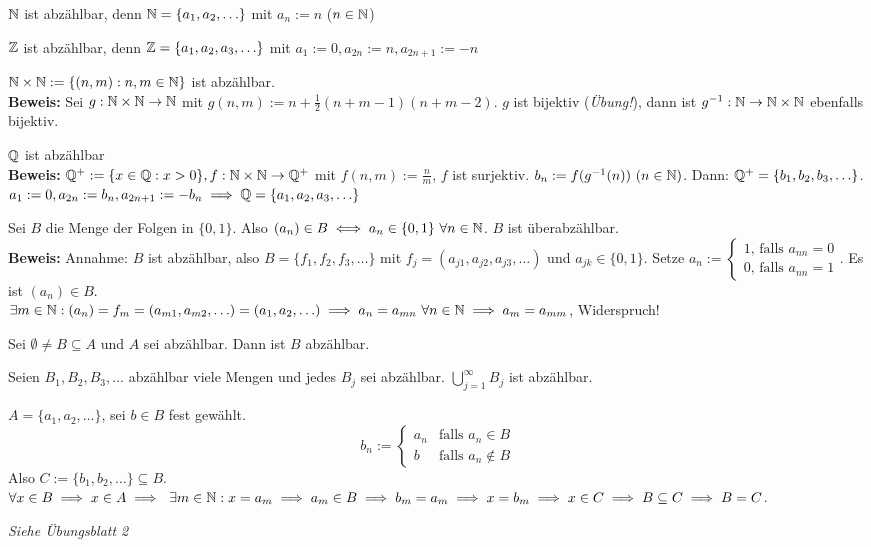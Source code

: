 \documentclass[a4paper,oneside,DIV15,BCOR12mm]{scrbook}
\begin{document}
\begin{beispiele}
\item $\mathbb{N}$ ist abzählbar, denn $\mathbb{N} = \{a_1,a_2,\ldots\}$ mit $a_n := n$ ($n\in \mathbb{N}$)
\item $\mathbb{Z}$ ist abzählbar, denn $\mathbb{Z} = \{a_1,a_2,a_3,\ldots\}$ mit $a_1:= 0, a_{2n} := n, a_{2n+1} := -n$
\item $\mathbb{N}\times\mathbb{N} := \{(n,m): n,m \in \mathbb{N}\}$ ist abzählbar.\\
\textbf{Beweis:} Sei $g: \mathbb{N}\times\mathbb{N} \rightarrow \mathbb{N}$ mit $g(n,m) := n+\frac{1}{2}(n+m-1)(n+m-2)$. $g$ ist bijektiv (\textit{Übung!}), dann ist $g^{-1}: \mathbb{N} \rightarrow \mathbb{N}\times\mathbb{N}$ ebenfalls bijektiv.
\item $\mathbb{Q}$ ist abzählbar\\
\textbf{Beweis:} $\mathbb{Q}^+ := \{x \in \mathbb{Q}: x>0\}, f:\mathbb{N}\times\mathbb{N} \rightarrow \mathbb{Q}^+$ mit $f(n,m) := \frac{n}{m}$, $f$ ist surjektiv. $b_n := f(g^{-1}(n))\ (n\in\MdN)$. Dann: $\mathbb{Q}^+ = \{b_1, b_2, b_3,\ldots\}$. $a_1:= 0, a_{2n} := b_n, a_{2n+1} := -b_n \implies \mathbb{Q} = \{a_1,a_2,a_3,\ldots\}$
\item Sei $B$ die Menge der Folgen in $\{0,1\}$. Also $(a_n)\in B \equizu a_n \in \{0,1\} \ \forall n \in \MdN$. $B$ ist überabzählbar.\\
\textbf{Beweis:} Annahme: $B$ ist abzählbar, also $B=\{f_1,f_2,f_3,\ldots\}$ mit $f_j = (a_{j1}, a_{j2}, a_{j3},\ldots)$ und $a_{jk} \in \{0,1\}$. Setze $a_n := \begin{cases}1\mbox{, falls } a_{nn} = 0 \\ 0\mbox{, falls }a_{nn} = 1\end{cases}$. Es ist $(a_n) \in B$. \\
$\exists m \in \mathbb{N}: (a_n) = f_m = (a_{m1}, a_{m2}, \ldots) = (a_1,a_2,\ldots) \implies a_n = a_{mn}\ \forall n \in \mathbb{N} \implies a_m = a_{mm}$, Widerspruch!
\end{beispiele}

\begin{satz*}
\begin{liste}
\item Sei $\emptyset \ne B \subseteq A$ und $A$ sei abzählbar. Dann ist $B$ abzählbar.
\item Seien $B_1, B_2, B_3, \ldots$ abzählbar viele Mengen und jedes $B_j$ sei abzählbar. $\displaystyle \bigcup_{j=1}^\infty B_j$ ist abzählbar.
\end{liste}
\end{satz*}

\begin{beweise}
\item $A = \{a_1,a_2,\ldots\}$, sei $b \in B$ fest gewählt.
$$ b_n := \begin{cases} a_n & \mbox{falls } a_n \in B \\ b & \mbox{falls } a_n \notin B \end{cases}$$
Also $C:=\{b_1,b_2,\ldots\} \subseteq B$. $\forall x \in B \folgt x \in A \folgt \ \exists m \in \MdN: x = a_m \folgt a_m \in B \folgt b_m = a_m \folgt x=b_m \folgt x \in C \folgt B \subseteq C \folgt B = C$.
\item \textit{Siehe Übungsblatt 2}
\end{beweise}
\end{document}
